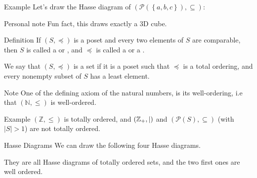 \documentclass[a4paper]{article}
\begin{document}
\begin{parag}{Example}
    Let's draw the Hasse diagram of $\left(\mathcal{P}\left(\left\{a, b, c\right\}\right), \subseteq\right)$:

    \begin{subparag}{Personal note}
        Fun fact, this draws exactly a 3D cube.
    \end{subparag}

\end{parag}

\begin{parag}{Definition}
    If $\left(S, \preccurlyeq\right)$ is a poset and every two elements of $S$ are comparable, then $S$ is called a  or , and $\preccurlyeq$ is called a  or a .

    We say that $\left(S, \preccurlyeq\right)$ is a  set if it is a poset such that $\preccurlyeq$ is a total ordering, and every nonempty subset of $S$ has a least element.

    \begin{subparag}{Note}
        One of the defining axiom of the natural numbers, is its well-ordering, i.e that $\left(\mathbb{N}, \leq\right)$ is well-ordered.
    \end{subparag}

    \begin{subparag}{Example}
        $\left(\mathbb{Z}, \leq\right)$ is totally ordered, and $\left(\mathbb{Z}_+, \divides\right)$ and $\left(\mathcal{P}\left(S\right), \subseteq\right)$ (with $\left|S\right| > 1$) are not totally ordered.
    \end{subparag}

    \begin{subparag}{Hasse Diagrams}
        We can draw the following four Hasse diagrams.

        They are all Hasse diagrams of totally ordered sets, and the two first ones are well ordered.
    \end{subparag}
\end{parag}
\end{document}
